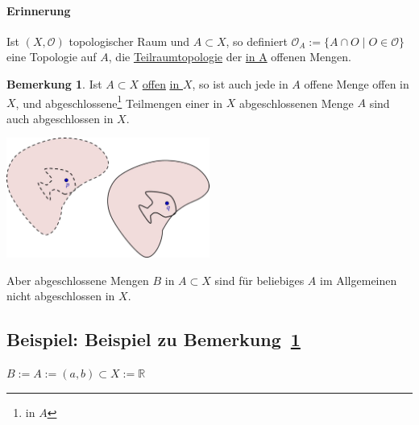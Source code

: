 \documentclass[a4paper,11pt,notitlepage]{report}
\theoremstyle{definition}
\newtheorem{remark}{Bemerkung}[chapter]
\newcommand{\R}{{\ensuremath{\mathbb{R}}}}
\newcommand{\OO}{{\ensuremath{\mathcal{O}}}}
\newenvironment{bsp}[1]
{
\setlength{\fboxsep}{10pt}
\subsection*{Beispiel: #1}
\begin{upshape}
}
{
\end{upshape}
}
\begin{document}
\paragraph{Erinnerung}
Ist $(X, \OO)$ topologischer Raum und $A \subset X$, so definiert
$\OO_A := \{ A \cap O \mid O \in \OO \}$ eine Topologie auf $A$, die
 \underline{Teilraumtopologie} der \underline{in A} offenen Mengen.
 
\begin{remark}
	\label{offenAbgeschlossen}
	Ist $A \subset X$ \underline{offen} \underline{\underline{in $X$}}, so ist auch jede in $A$ offene Menge offen in $X$, und abgeschlossene\footnote{in $A$} Teilmengen einer in $X$ abgeschlossenen Menge $A$ sind auch abgeschlossen in $X$.
		
		\begin{center}
	\includegraphics[width=0.5\textwidth]{images/offen_abgeschlossen.png}
	\end{center}
	Aber abgeschlossene Mengen $B$ in $A \subset X$ sind für beliebiges $A$ im Allgemeinen nicht abgeschlossen in $X$.
\end{remark}

\begin{bsp}{Beispiel zu Bemerkung~\ref{offenAbgeschlossen}}
	$B := A := (a,b) \subset X := \R$
\end{bsp}
\end{document}
